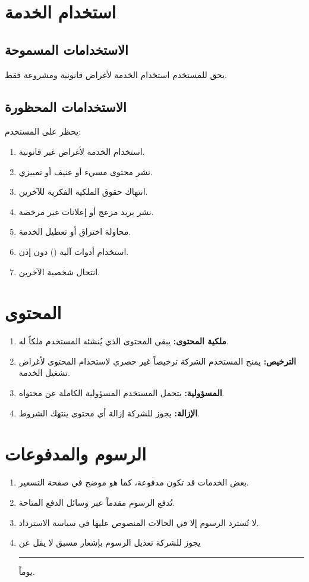\documentclass[11pt,a4paper]{article}
\begin{document}
\section{استخدام الخدمة}
\label{sec:use}
\subsection{الاستخدامات المسموحة}
يحق للمستخدم استخدام الخدمة لأغراض قانونية ومشروعة فقط.

\subsection{الاستخدامات المحظورة}
يحظر على المستخدم:
\begin{enumerate}
    \item استخدام الخدمة لأغراض غير قانونية.
    \item نشر محتوى مسيء أو عنيف أو تمييزي.
    \item انتهاك حقوق الملكية الفكرية للآخرين.
    \item نشر بريد مزعج أو إعلانات غير مرخصة.
    \item محاولة اختراق أو تعطيل الخدمة.
    \item استخدام أدوات آلية () دون إذن.
    \item انتحال شخصية الآخرين.
\end{enumerate}

\section{المحتوى}
\label{sec:content}
\begin{enumerate}
    \item \textbf{ملكية المحتوى:} يبقى المحتوى الذي يُنشئه المستخدم ملكاً له.
    \item \textbf{الترخيص:} يمنح المستخدم الشركة ترخيصاً غير حصري لاستخدام المحتوى لأغراض تشغيل الخدمة.
    \item \textbf{المسؤولية:} يتحمل المستخدم المسؤولية الكاملة عن محتواه.
    \item \textbf{الإزالة:} يجوز للشركة إزالة أي محتوى ينتهك الشروط.
\end{enumerate}

\section{الرسوم والمدفوعات}
\label{sec:fees}
\begin{enumerate}
    \item بعض الخدمات قد تكون مدفوعة، كما هو موضح في صفحة التسعير.
    \item تُدفع الرسوم مقدماً عبر وسائل الدفع المتاحة.
    \item لا تُسترد الرسوم إلا في الحالات المنصوص عليها في سياسة الاسترداد.
    \item يجوز للشركة تعديل الرسوم بإشعار مسبق لا يقل عن \rule{2cm}{0.4pt} يوماً.
\end{enumerate}
\end{document}
